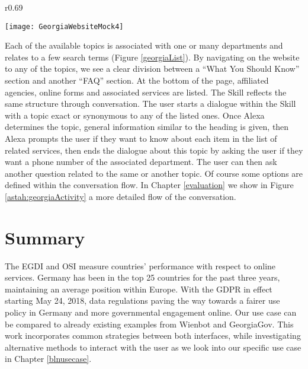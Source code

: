 \begin{wrapfigure}{r}{0.69\textwidth}
	\begin{center}	
	\caption[Georgia.gov Popular Topics]{Georgia.gov Popular Topics - Based on \href{https://georgia.gov/popular-topics}{georgia.gov/popular-topics}}
	\label{georgiaList}
	\centering
	\texttt{[image: GeorgiaWebsiteMock4]}
	\end{center}
\end{wrapfigure}




Each of the available topics is associated with one or many departments and relates to a few search terms (Figure \ref{georgiaList}). By navigating on the website to any of the topics, we see a clear division between a ``What You Should Know'' section and another ``FAQ'' section. At the bottom of the page, affiliated agencies, online forms and associated services are listed. The Skill reflects the same structure through conversation. The user starts a dialogue within the Skill with a topic exact or synonymous to any of the listed ones. Once Alexa determines the topic, general information similar to the heading is given, then Alexa prompts the user if they want to know about each item in the list of related services, then ends the dialogue about this topic by asking the user if they want a phone number of the associated department. The user can then ask another question related to the same or another topic. Of course some options are defined within the conversation flow. In Chapter \ref{evaluation} we show in Figure \ref{astah:georgiaActivity} a more detailed flow of the conversation.










\section{Summary}

The EGDI and OSI measure countries' performance with respect to online services. Germany has been in the top 25 countries for the past three years, maintaining an average position within Europe. With the GDPR in effect starting May 24, 2018, data regulations paving the way towards a fairer use policy in Germany and more governmental engagement online. Our use case can be compared to already existing examples from Wienbot and GeorgiaGov. This work incorporates common strategies between both interfaces, while investigating alternative methods to interact with the user as we look into our specific use case in Chapter \ref{blnusecase}. 




